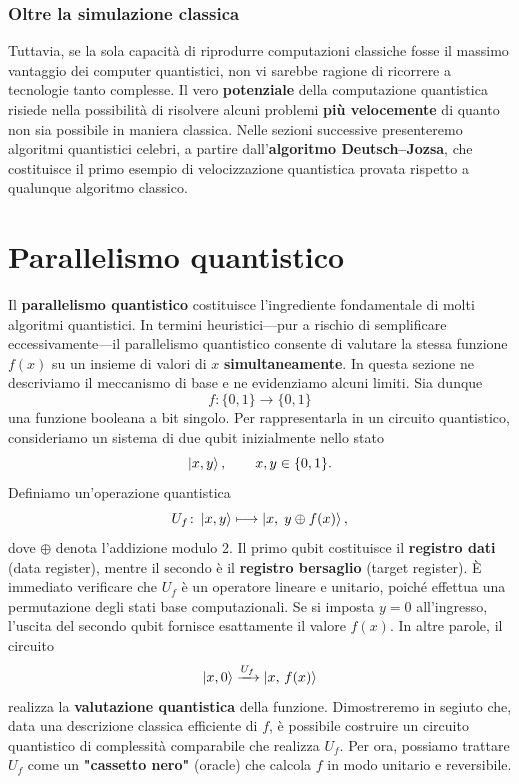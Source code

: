 \documentclass[a4paper,12pt]{report}
\theoremstyle{plain}
\begin{document}
\subsubsection{Oltre la simulazione classica}
Tuttavia, se la sola capacità di riprodurre computazioni classiche fosse il massimo vantaggio dei computer quantistici, non vi sarebbe ragione di ricorrere a tecnologie tanto complesse. Il vero \textbf{potenziale} della computazione quantistica risiede nella possibilità di risolvere alcuni problemi \textbf{più velocemente} di quanto non sia possibile in maniera classica. Nelle sezioni successive presenteremo algoritmi quantistici celebri, a partire dall'\textbf{algoritmo Deutsch–Jozsa}, che costituisce il primo esempio di velocizzazione quantistica provata rispetto a qualunque algoritmo classico.

\section{Parallelismo quantistico}
Il \textbf{parallelismo quantistico} costituisce l'ingrediente fondamentale di molti algoritmi quantistici. In termini heuristici---pur a rischio di semplificare eccessivamente---il parallelismo quantistico consente di valutare la stessa funzione $f(x)$ su un insieme di valori di $x$ \textbf{simultaneamente}. In questa sezione ne descriviamo il meccanismo di base e ne evidenziamo alcuni limiti.
Sia dunque
\[
f\colon\{0,1\} \to \{0,1\}
\]
una funzione booleana a bit singolo. Per rappresentarla in un circuito quantistico, consideriamo un sistema di due qubit inizialmente nello stato
\[
\ket{x,y}, \qquad x,y\in\{0,1\}.
\]
Definiamo un'operazione quantistica
\[
U_f\colon \ket{x,y} \longmapsto \ket{x,\; y \oplus f(x)},
\]
dove $\oplus$ denota l'addizione modulo 2. Il primo qubit costituisce il \textbf{registro dati} (data register), mentre il secondo è il \textbf{registro bersaglio} (target register). È immediato verificare che $U_f$ è un operatore lineare e unitario, poiché effettua una permutazione degli stati base computazionali.
Se si imposta $y=0$ all'ingresso, l'uscita del secondo qubit fornisce esattamente il valore $f(x)$. In altre parole, il circuito
\[
\ket{x,0} \xrightarrow{U_f} \ket{x,\,f(x)}
\]
realizza la \textbf{valutazione quantistica} della funzione.
Dimostreremo in segiuto che, data una descrizione classica efficiente di $f$, è possibile costruire un circuito quantistico di complessità comparabile che realizza $U_f$. Per ora, possiamo trattare $U_f$ come un \textbf{"cassetto nero"} (oracle) che calcola $f$ in modo unitario e reversibile.
\end{document}
